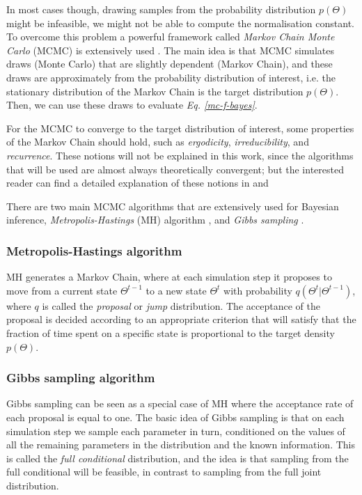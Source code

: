 In most cases though, drawing samples from the probability distribution $p(\Theta)$ might be infeasible, \eg we might not be able to compute the normalisation constant. To overcome this problem a powerful framework called \emph{Markov Chain Monte Carlo} (MCMC) is extensively used \citep{Neal1998}. The main idea is that MCMC simulates draws (\ie Monte Carlo) that are slightly dependent (\ie Markov Chain), and these draws are approximately from the probability distribution of interest, i.e. the stationary distribution of the Markov Chain is the target distribution $p(\Theta)$. Then, we can use these draws to evaluate \emph{Eq. \ref{mc-f-bayes}}.

For the MCMC to converge to the target distribution of interest, some properties of the Markov Chain should hold, such as \emph{ergodicity}, \emph{irreducibility}, and \emph{recurrence}. These notions will not be explained in this work, since the algorithms that will be used are almost always theoretically convergent; but the interested reader can find a detailed explanation of these notions in \citet{Robert1999} and \citet{Liu2001}

There are two main MCMC algorithms that are extensively used for Bayesian inference, \emph{Metropolis-Hastings} (MH) algorithm \citep{Metropolis1953, Hastings1970}, and \emph{Gibbs sampling} \citep{Geman1984, Gelfand1990}. 

\subsubsection*{Metropolis-Hastings algorithm}
MH generates a Markov Chain, where at each simulation step it proposes to move from a current state $\Theta^{t-1}$ to a new state $\Theta^{t}$ with probability $q(\Theta^{t}|\Theta^{t-1})$, where $q$ is called the \emph{proposal} or \emph{jump} distribution. The acceptance of the proposal is decided according to an appropriate criterion that will satisfy that the fraction of time spent on a specific state is proportional to the target density $p(\Theta)$.

\subsubsection*{Gibbs sampling algorithm}
Gibbs sampling can be seen as a special case of MH where the acceptance rate of each proposal is equal to one. The basic idea of Gibbs sampling is that on each simulation step we sample each parameter in turn, conditioned on the values of all the remaining parameters in the distribution and the known information. This is called the \emph{full conditional} distribution, and the idea is that sampling from the full conditional will be feasible, in contrast to sampling from the full joint distribution.


